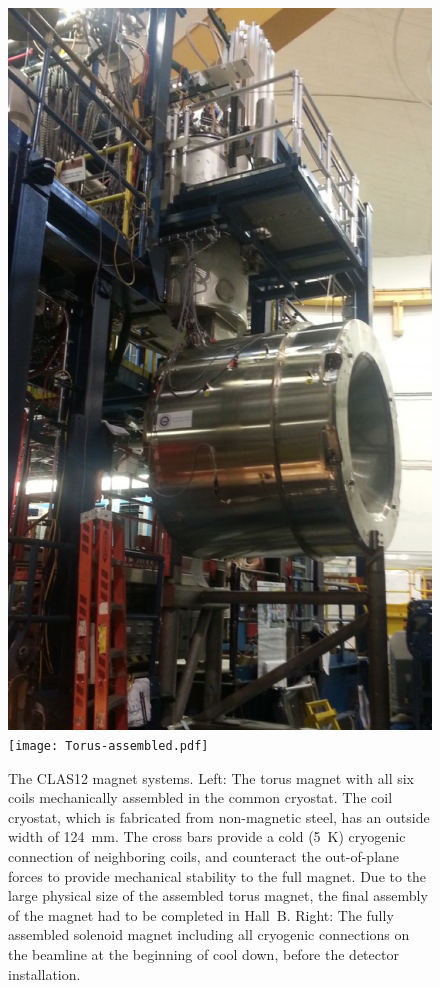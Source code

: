 \documentclass[final,3p,twocolumn]{elsarticle}
\begin{document}
\begin{figure}[t!]
\centerline{\includegraphics[width=0.65\columnwidth]{solenoid-magnet.png}
\texttt{[image: Torus-assembled.pdf]}}
\caption{The CLAS12 magnet systems. Left: The torus magnet with all six coils mechanically assembled in the
  common cryostat. The coil cryostat, which is fabricated from non-magnetic steel, has an outside width of 124~mm.
  The cross bars provide a cold (5~K) cryogenic connection of neighboring coils, and counteract the out-of-plane
  forces to provide mechanical stability to the full magnet. Due to the large physical size of the assembled torus
  magnet, the final assembly of the magnet had to be completed in Hall~B. Right: The fully assembled solenoid magnet
  including all cryogenic connections on the beamline at the beginning of cool down, before the detector installation.}
\label{clas12-magnets}
\end{figure}
\end{document}
